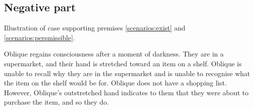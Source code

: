 \documentclass[10pt]{article}
\newcommand{\hozlinedash}[0]{%
  \noindent\hdashrule[0.5ex][c]{\textwidth}{.1pt}{2.5pt}
}
\begin{document}




\newpage


\subsection{Negative part}
\label{sec:negative-part}


Illustration of case supporting premises \ref{scenarios:exist} and \ref{scenarios:persmissible}.

\hozlinedash

\begin{scenario}[Supermarket]
  Oblique regains consciousness after a moment of darkness.
  They are in a supermarket, and their hand is stretched toward an item on a shelf.
  Oblique is unable to recall why they are in the supermarket and is unable to recognise what the item on the shelf would be for.
  Oblique does not have a shopping list.
  However, Oblique's outstretched hand indicates to them that they were about to purchase the item, and so they do.
\end{scenario}
\end{document}
